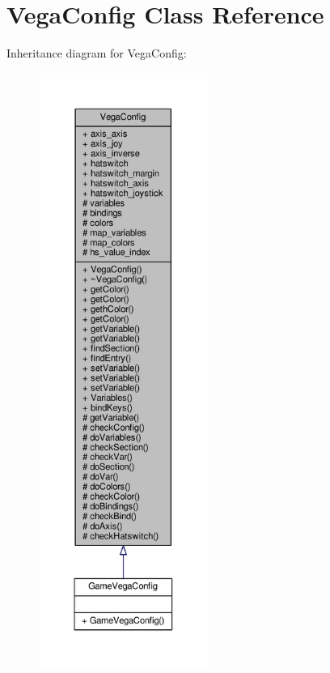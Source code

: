 \hypertarget{classVegaConfig}{}\section{Vega\+Config Class Reference}
\label{classVegaConfig}


Inheritance diagram for Vega\+Config\+:
\nopagebreak
\begin{figure}[H]
\begin{center}
\leavevmode
\includegraphics[height=550pt]{de/dc0/classVegaConfig__inherit__graph}
\end{center}
\end{figure}


